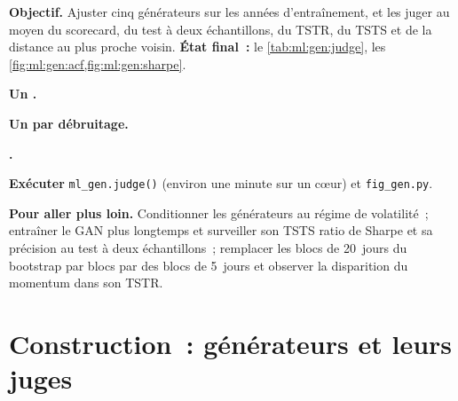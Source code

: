 \begin{tutorial}
\textbf{Objectif.} Ajuster cinq générateurs sur les années d'entraînement, et les juger au moyen du scorecard, du test à deux
échantillons, du TSTR, du TSTS et de la distance au plus proche voisin. \textbf{État final~:} le \cref{tab:ml:gen:judge}, les \cref{fig:ml:gen:acf,fig:ml:gen:sharpe}.
\begin{tutsteps}
\item \textbf{Un .}
\label{lst:ml:gen:gan}
\item \textbf{Un  par débruitage.}
\label{lst:ml:gen:diffusion}
\item \textbf{.}
\label{lst:ml:gen:tests}
\item \textbf{Exécuter} \texttt{ml\_gen.judge()} (environ une minute sur un cœur) et \texttt{fig\_gen.py}.
\end{tutsteps}
\textbf{Pour aller plus loin.} Conditionner les générateurs au régime de volatilité~; entraîner le GAN plus longtemps et surveiller son TSTS
ratio de Sharpe et sa précision au test à deux échantillons~; remplacer les blocs de 20~jours du bootstrap par blocs par des blocs de 5~jours et observer
la disparition du momentum dans son TSTR.
\end{tutorial}

\section{Construction~: générateurs et leurs juges}\label{bld:ml:generative-models-and-synthetic-data:genmkt}

